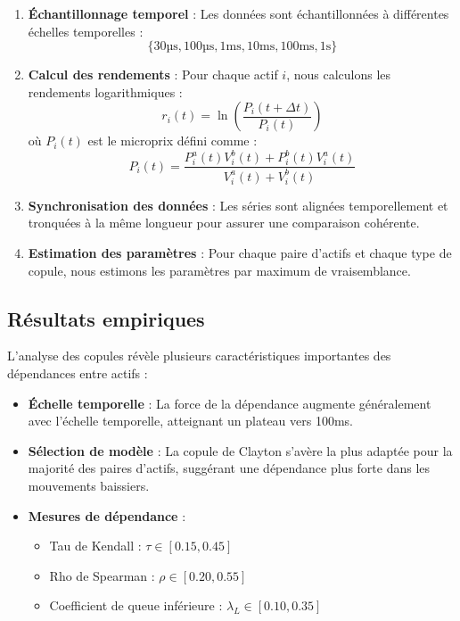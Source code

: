 \documentclass[10pt,a4paper]{article}
\theoremstyle{definition}
\theoremstyle{remark}
\begin{document}
\begin{itemize}
\begin{enumerate}
    \item \textbf{Échantillonnage temporel} : Les données sont échantillonnées à différentes échelles temporelles :
    \[\{\text{30µs}, \text{100µs}, \text{1ms}, \text{10ms}, \text{100ms}, \text{1s}\}\]
    
    \item \textbf{Calcul des rendements} : Pour chaque actif $i$, nous calculons les rendements logarithmiques :
    \[r_i(t) = \ln\left(\frac{P_i(t+\Delta t)}{P_i(t)}\right)\]
    où $P_i(t)$ est le microprix défini comme :
    \[P_i(t) = \frac{P^a_i(t)V^b_i(t) + P^b_i(t)V^a_i(t)}{V^a_i(t) + V^b_i(t)}\]
    
    \item \textbf{Synchronisation des données} : Les séries sont alignées temporellement et tronquées à la même longueur pour assurer une comparaison cohérente.
    
    \item \textbf{Estimation des paramètres} : Pour chaque paire d'actifs et chaque type de copule, nous estimons les paramètres par maximum de vraisemblance.
\end{enumerate}

\subsection{Résultats empiriques}

L'analyse des copules révèle plusieurs caractéristiques importantes des dépendances entre actifs :

    \begin{itemize}
    \item \textbf{Échelle temporelle} : La force de la dépendance augmente généralement avec l'échelle temporelle, atteignant un plateau vers 100ms.
    
    \item \textbf{Sélection de modèle} : La copule de Clayton s'avère la plus adaptée pour la majorité des paires d'actifs, suggérant une dépendance plus forte dans les mouvements baissiers.
    
    \item \textbf{Mesures de dépendance} :
    \begin{itemize}
        \item Tau de Kendall : $\tau \in [0.15, 0.45]$
        \item Rho de Spearman : $\rho \in [0.20, 0.55]$
        \item Coefficient de queue inférieure : $\lambda_L \in [0.10, 0.35]$
    \end{itemize}
    \end{itemize}
    

\end{itemize}
\end{document}
